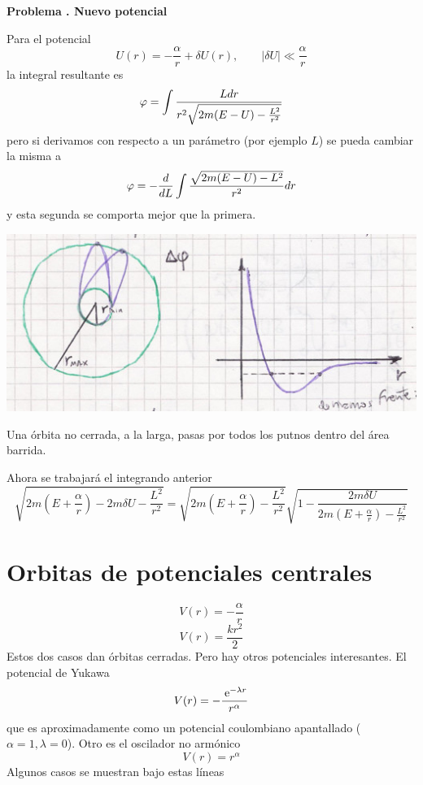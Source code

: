 \documentclass[10pt,oneside]{CBFT_book}
\begin{document}
\begin{ejemplo}{\bf Problema . Nuevo potencial}

Para el potencial 
\[
	U(r) = -\frac{\alpha}{r} + \delta U(r), \qquad |\delta U| \ll \frac{\alpha}{r}
\]
la integral resultante es
\[
	\varphi = \int \frac{L dr }{r^2\sqrt{2m(E-U)-\frac{L^2}{r^2}}}
\]
pero si derivamos con respecto a un parámetro (por ejemplo $L$) se pueda cambiar la misma a 
\[
	\varphi = - \frac{d^{\hspace{-0.05em}} {}}{d {L}^{\hspace{-0.05em}}} \int \frac{ \sqrt{2m(E-U)- L^2} }{r^2}dr
\]
y esta segunda se comporta mejor que la primera.

\includegraphics[scale=0.35]{images/fig_mc_potencial_central_problema.jpg}

Una órbita no cerrada, a la larga, pasas por todos los putnos dentro del área barrida.

Ahora se trabajará el integrando anterior
\[
\sqrt{ 2m \left(E+ \frac{\alpha}{r}\right) - 2m\delta U - \frac{L^2}{r^2} } =
\sqrt{ 2m \left(E+ \frac{\alpha}{r}\right) - \frac{L^2}{r^2} } 
\sqrt{ 1 - \frac{ 2m\delta U }{ 2m \left(E+ \frac{\alpha}{r}\right) - \frac{L^2}{r^2} }  }
\]

\end{ejemplo}


\section{Orbitas de potenciales centrales}

\[
	V(r) = -\frac{\alpha}{r}
\]
\[
	V(r) = \frac{ k r^2 }{2}
\]
Estos dos casos dan órbitas cerradas. Pero hay otros potenciales interesantes.
El potencial de Yukawa
\[
	V(r) = - \frac{\:\mathrm{e}^{-\lambda r}}{r^\alpha}
\]
que es aproximadamente como un potencial coulombiano apantallado ($\alpha=1,\lambda=0$).
Otro es el oscilador no armónico
\[
	V(r) = r^\alpha
\]
Algunos casos se muestran bajo estas líneas
\end{document}
